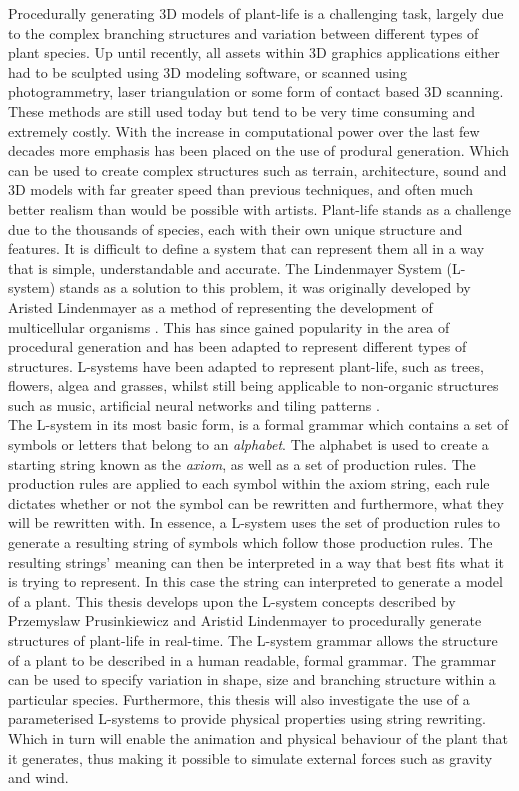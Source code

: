
\lettrine[lines=3]{P}{}rocedurally generating 3D models of plant-life is a challenging task, largely due to the complex branching structures and variation between different types of plant species. Up until recently, all assets within 3D graphics applications either had to be sculpted using 3D modeling software, or scanned using photogrammetry, laser triangulation or some form of contact based 3D scanning. These methods are still used today but tend to be very time consuming and extremely costly. With the increase in computational power over the last few decades more emphasis has been placed on the use of produral generation. Which can be used to create complex structures such as terrain, architecture, sound and 3D models with far greater speed than previous techniques, and often much better realism than would be possible with artists. Plant-life stands as a challenge due to the thousands of species, each with their own unique structure and features. It is difficult to define a system that can represent them all in a way that is simple, understandable and accurate. The Lindenmayer System (L-system) stands as a solution to this problem, it was originally developed by Aristed Lindenmayer as a method of representing the development of multicellular organisms \cite{lindenmayer1968mathematical}. This has since gained popularity in the area of procedural generation and has been adapted to represent different types of structures. L-systems have been adapted to represent plant-life, such as trees, flowers, algea and grasses, whilst still being applicable to non-organic structures such as music, artificial neural networks and tiling patterns \cite{Prusinkiewicz1989}.\\

The L-system in its most basic form, is a formal grammar which contains a set of symbols or letters that belong to an \textit{alphabet}. The alphabet is used to create a starting string known as the \textit{axiom}, as well as a set of production rules. The production rules are applied to each symbol within the axiom string, each rule dictates whether or not the symbol can be rewritten and furthermore, what they will be rewritten with. In essence, a L-system uses the set of production rules to generate a resulting string of symbols which follow those production rules. The resulting strings' meaning can then be interpreted in a way that best fits what it is trying to represent. In this case the string can interpreted to generate a model of a plant. This thesis develops upon the L-system concepts described by Przemyslaw Prusinkiewicz and Aristid Lindenmayer to procedurally generate structures of plant-life in real-time. The L-system grammar allows the structure of a plant to be described in a human readable, formal grammar. The grammar can be used to specify variation in shape, size and branching structure within a particular species. Furthermore, this thesis will also investigate the use of a parameterised L-systems to provide physical properties using string rewriting. Which in turn will enable the animation and physical behaviour of the plant that it generates, thus making it possible to simulate external forces such as gravity and wind.\\

